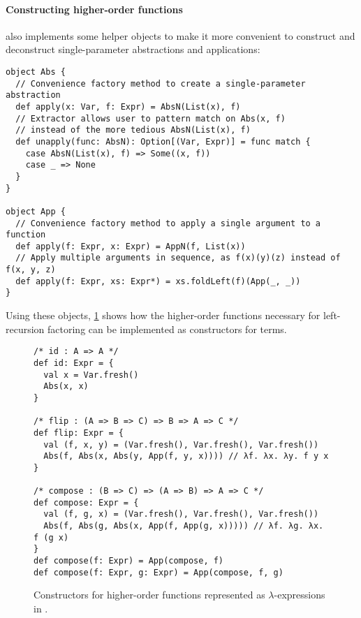 \documentclass[../../../main.tex]{subfiles}
\begin{document}
\paragraph{Constructing higher-order functions}
 also implements some helper objects to make it more convenient to construct and deconstruct single-parameter abstractions and applications:
\begin{verbatim}
object Abs {
  // Convenience factory method to create a single-parameter abstraction
  def apply(x: Var, f: Expr) = AbsN(List(x), f)
  // Extractor allows user to pattern match on Abs(x, f)
  // instead of the more tedious AbsN(List(x), f)
  def unapply(func: AbsN): Option[(Var, Expr)] = func match {
    case AbsN(List(x), f) => Some((x, f))
    case _ => None
  }
}

object App {
  // Convenience factory method to apply a single argument to a function
  def apply(f: Expr, x: Expr) = AppN(f, List(x))
  // Apply multiple arguments in sequence, as f(x)(y)(z) instead of f(x, y, z)
  def apply(f: Expr, xs: Expr*) = xs.foldLeft(f)(App(_, _))
}
\end{verbatim}
%
Using these objects, \cref{fig:higher-order-funcs} shows how the higher-order functions necessary for left-recursion factoring can be implemented as constructors for  terms.

\begin{figure}
\begin{verbatim}
/* id : A => A */
def id: Expr = {
  val x = Var.fresh()
  Abs(x, x)
}

/* flip : (A => B => C) => B => A => C */
def flip: Expr = {
  val (f, x, y) = (Var.fresh(), Var.fresh(), Var.fresh())
  Abs(f, Abs(x, Abs(y, App(f, y, x)))) // λf. λx. λy. f y x
}

/* compose : (B => C) => (A => B) => A => C */
def compose: Expr = {
  val (f, g, x) = (Var.fresh(), Var.fresh(), Var.fresh())
  Abs(f, Abs(g, Abs(x, App(f, App(g, x))))) // λf. λg. λx. f (g x)
}
def compose(f: Expr) = App(compose, f)
def compose(f: Expr, g: Expr) = App(compose, f, g)
\end{verbatim}
\caption{Constructors for higher-order functions represented as $\lambda$-expressions in .}
\label{fig:higher-order-funcs}
\end{figure}

\end{document}

